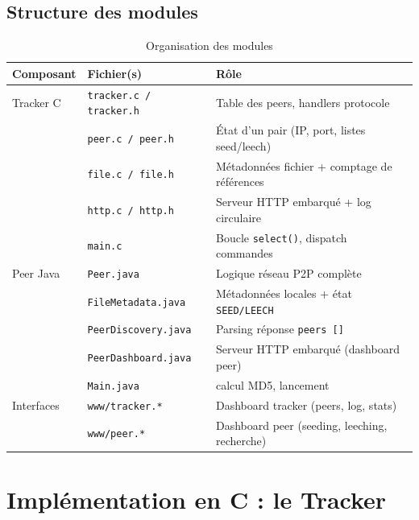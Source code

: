 \documentclass[12pt,a4paper]{article}
\begin{document}
\subsection{Structure des modules}

\begin{table}[H]
\centering
\begin{tabularx}{\textwidth}{l l X}
\toprule
\textbf{Composant} & \textbf{Fichier(s)} & \textbf{Rôle} \\
\midrule
Tracker C & \texttt{tracker.c / tracker.h} & Table des peers, handlers protocole \\
          & \texttt{peer.c / peer.h}        & État d'un pair (IP, port, listes seed/leech) \\
          & \texttt{file.c / file.h}        & Métadonnées fichier + comptage de références \\
          & \texttt{http.c / http.h}        & Serveur HTTP embarqué + log circulaire \\
          & \texttt{main.c}                 & Boucle \texttt{select()}, dispatch commandes \\
\midrule
Peer Java & \texttt{Peer.java}              & Logique réseau P2P complète \\
          & \texttt{FileMetadata.java}      & Métadonnées locales + état \texttt{SEED/LEECH} \\
          & \texttt{PeerDiscovery.java}     & Parsing réponse \texttt{peers []} \\
          & \texttt{PeerDashboard.java}     & Serveur HTTP embarqué (dashboard peer) \\
          & \texttt{Main.java}              & calcul MD5, lancement \\
\midrule
Interfaces & \texttt{www/tracker.*}         & Dashboard tracker (peers, log, stats) \\
           & \texttt{www/peer.*}            & Dashboard peer (seeding, leeching, recherche) \\
\bottomrule
\end{tabularx}
\caption{Organisation des modules}
\end{table}

\section{Implémentation en C : le Tracker}
\end{document}
